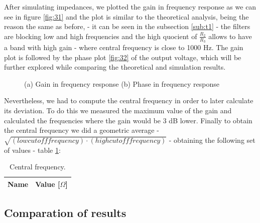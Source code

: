 \par After simulating impedances, we plotted the gain in frequency response as we can see in figure \ref{fig:31} and the plot is similar to the theoretical analysis, being the 
reason the same as before, - it can be seen in the subsection \ref{sub:t1} - the filters are blocking low and high frequencies and the high quocient of $\frac{R_{2}}{R_{3}}$ 
allows to have a band with high gain - where central frequency is close to 1000 Hz. 
The gain plot is followed by the phase plot \ref{fig:32} of the output voltage, which will be further explored while comparing the theoretical and simulation results.

\begin{figure}[h!]
           \centering
           \caption{(a) Gain in frequency response (b) Phase in frequency response}

\end{figure}

\vspace {5cm}

\par Nevertheless, we had to compute the central frequency in order to later calculate its deviation. To do this we measured the maximum value of the gain and calculated the frequencies where 
the gain would be 3 dB lower. Finally to obtain the central frequency we did a geometric average - $\sqrt{(low cut off frequency)\cdot(high cut off frequency)}$ - obtaining the following set of 
values - table \ref{tab:5}:

\vspace {1cm}

\begin{table}[h]
  \centering
  \begin{tabular}{|l|r|}
    \hline    
    {\bf Name} & {\bf Value [{$\Omega$}]} \\ \hline
    
  \end{tabular}
  \caption{Central frequency.}
  \label{tab:5}
\end{table}




\subsection{Comparation of results} 
\label{sub:comp}


